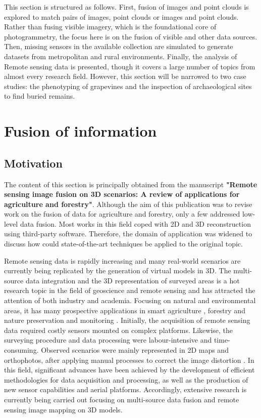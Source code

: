 This section is structured as follows. First, fusion of images and point clouds is explored to match pairs of images, point clouds or images and point clouds. Rather than fusing visible imagery, which is the foundational core of photogrammetry, the focus here is on the fusion of visible and other data sources. Then, missing sensors in the available collection are simulated to generate datasets from metropolitan and rural environments. Finally, the analysis of Remote sensing data is presented, though it covers a large number of topics from almost every research field. However, this section will be narrowed to two case studies: the phenotyping of grapevines and the inspection of archaeological sites to find buried remains.

\section{Fusion of information}

\subsection{Motivation}

The content of this section is principally obtained from the manuscript \textbf{"Remote sensing image fusion on 3D scenarios: A review of applications for agriculture and forestry"}. Although the aim of this publication was to revise work on the fusion of data for agriculture and forestry, only a few addressed low-level data fusion. Most works in this field coped with 2D and 3D reconstruction using third-party software. Therefore, the domain of application was widened to discuss how could state-of-the-art techniques be applied to the original topic.

Remote sensing data is rapidly increasing and many real-world scenarios are currently being replicated by the generation of virtual models in 3D. The multi-source data integration and the 3D representation of surveyed areas is a hot research topic in the field of geoscience and remote sensing and has attracted the attention of both industry and academia. Focusing on natural and environmental areas, it has many prospective applications in smart agriculture \cite{jurado_multispectral_2020, padua_vineyard_2019, poblete_discriminating_2021}, forestry and nature preservation \cite{almeida_monitoring_2021, guimaraes_forestry_2020, heckel_predicting_2020, schiefer_mapping_2020} and monitoring \cite{maimaitijiang_crop_2020}. Initially, the acquisition of remote sensing data required costly sensors mounted on complex platforms. Likewise, the surveying procedure and data processing were labour-intensive and time-consuming. Observed scenarios were mainly represented in 2D maps and orthophotos, after applying manual processes to correct the image distortion \cite{vong_how_2021}. In this field, significant advances have been achieved by the development of efficient methodologies for data acquisition and processing, as well as the production of new sensor capabilities and aerial platforms. Accordingly, extensive research is currently being carried out focusing on multi-source data fusion and remote sensing image mapping on 3D models.

